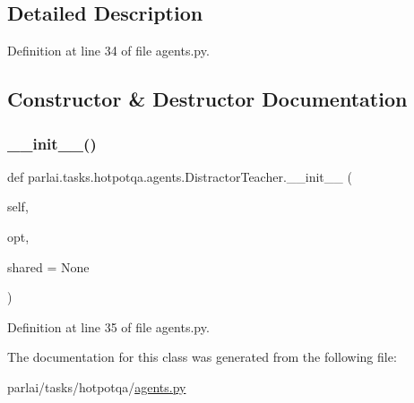 \subsection{Detailed Description}


Definition at line 34 of file agents.\+py.



\subsection{Constructor \& Destructor Documentation}
\mbox{\label{classparlai_1_1tasks_1_1hotpotqa_1_1agents_1_1DistractorTeacher_a933e9ee4fe9a8557477562a9a05d598c}} 
\subsubsection{\texorpdfstring{\+\_\+\+\_\+init\+\_\+\+\_\+()}{\_\_init\_\_()}}
{\footnotesize\ttfamily def parlai.\+tasks.\+hotpotqa.\+agents.\+Distractor\+Teacher.\+\_\+\+\_\+init\+\_\+\+\_\+ (\begin{DoxyParamCaption}\item[{}]{self,  }\item[{}]{opt,  }\item[{}]{shared = {\ttfamily None} }\end{DoxyParamCaption})}



Definition at line 35 of file agents.\+py.



The documentation for this class was generated from the following file\+:\begin{DoxyCompactItemize}
\item 
parlai/tasks/hotpotqa/\hyperlink{parlai_2tasks_2hotpotqa_2agents_8py}{agents.\+py}\end{DoxyCompactItemize}
